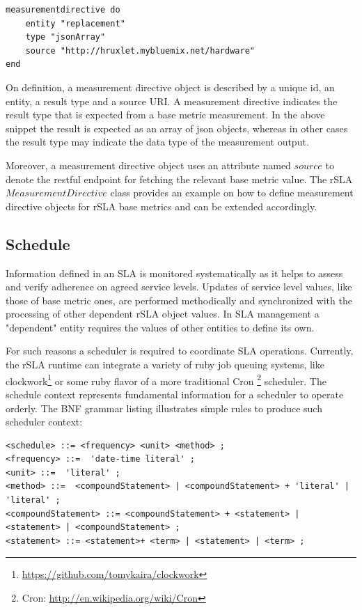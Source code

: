 \documentclass{llncs}
\begin{document}
\begin{lstlisting}[breaklines, firstnumber=auto, caption= rSLA measurementDirective definition, label=MDblst]
measurementdirective do
 	entity "replacement"
 	type "jsonArray"
 	source "http://hruxlet.mybluemix.net/hardware"
end
\end{lstlisting} 

On definition, a measurement directive object is described by a unique id, an entity, a result type and a source URI. A measurement directive indicates the result type that is expected from a base metric measurement. In the above snippet the result is expected as an array of json objects, whereas in other cases the result type may indicate the data type of the measurement output. 

Moreover, a measurement directive object uses an attribute named $source$ to denote the restful endpoint for fetching the relevant base metric value. The rSLA $MeasurementDirective$ class provides an example on how to define measurement directive objects for rSLA base metrics and can be extended accordingly.

\subsection{Schedule}\label{schedule}
Information defined in an SLA is monitored systematically as it helps to assess and verify adherence on agreed service levels. Updates of service level values, like those of base metric ones, are performed methodically and synchronized with the processing of other dependent rSLA object values. In SLA management \cite{ensel} a "dependent" entity requires the values of other entities to define its own.

For such reasons a scheduler is required to coordinate SLA operations. Currently, the rSLA runtime can integrate a variety of ruby job queuing systems, like clockwork\footnote{\url{https://github.com/tomykaira/clockwork}} or some ruby flavor of a more traditional Cron \footnote{Cron: \url{http://en.wikipedia.org/wiki/Cron}} scheduler. The schedule context represents fundamental information for a scheduler to operate orderly. The BNF grammar listing illustrates simple rules to produce such scheduler context:

\begin{lstlisting}[breaklines, firstnumber=auto, caption= $<Schedule>$ BNF grammar, label=Schedlst]
<schedule> ::= <frequency> <unit> <method> ;
<frequency> ::=  'date-time literal' ;
<unit> ::=  'literal' ;
<method> ::=  <compoundStatement> | <compoundStatement> + 'literal' | 'literal' ;
<compoundStatement> ::= <compoundStatement> + <statement> | <statement> | <compoundStatement> ;
<statement> ::= <statement>+ <term> | <statement> | <term> ;
\end{lstlisting}
\end{document}
